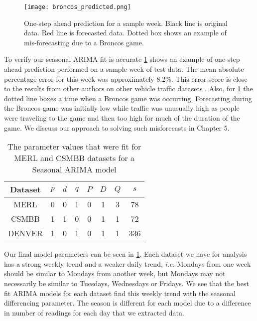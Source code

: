 \begin{figure}[!h]
\begin{center}
\texttt{[image: broncos\_predicted.png]}
\end{center}
\caption{One-step ahead prediction for a sample week.  Black line is original data.  Red line is forecasted data.  Dotted box shows an example of mis-forecasting due to a Broncos game.}
\label{fig:arima_prediction}
\end{figure}

To verify our seasonal ARIMA fit is accurate \ref{fig:arima_prediction} shows an example of one-step ahead prediction performed on a sample week of test data.  The mean absolute percentage error for this week was approximately 8.2\%.  This error score is close to the results from other authors on other vehicle traffic datasets \cite{Williams2003,Smith1997}.  Also, for \ref{fig:arima_prediction} the dotted line boxes a time when a Broncos game was occurring.  Forecasting during the Broncos game was initially low while traffic was unusually high as people were traveling to the game and then too high for much of the duration of the game.  We discuss our approach to solving such misforecasts in Chapter 5.

\begin{table}[!h]
\centering
\caption{The parameter values that were fit for MERL and CSMBB datasets for a Seasonal ARIMA model}
\begin{tabular}{|c|c|c|c|c|c|c|c|} \hline
Dataset & $p$ & $d$ & $q$ & $P$ & $D$ & $Q$ & $s$\\ \hline
MERL & 0 & 0 & 1 & 0 & 1 & 3 & 78\\ \hline
CSMBB & 1 & 1 & 0 & 0 & 1 & 1 & 72\\ \hline
DENVER & 1 & 0 & 1 & 0 & 1 & 1 & 336\\ \hline
\end{tabular}
\label{fig:sarimatab}
\end{table}

Our final model parameters can be seen in \ref{fig:sarimatab}.  Each dataset we have for analysis has a strong weekly trend and a weaker daily trend, \textit{i.e.} Mondays from one week should be similar to Mondays from another week, but Mondays may not necessarily be similar to Tuesdays, Wednesdays or Fridays.  We see that the best fit ARIMA models for each dataset find this weekly trend with the seasonal differencing parameter.  The season is different for each model due to a difference in number of readings for each day that we extracted data.


